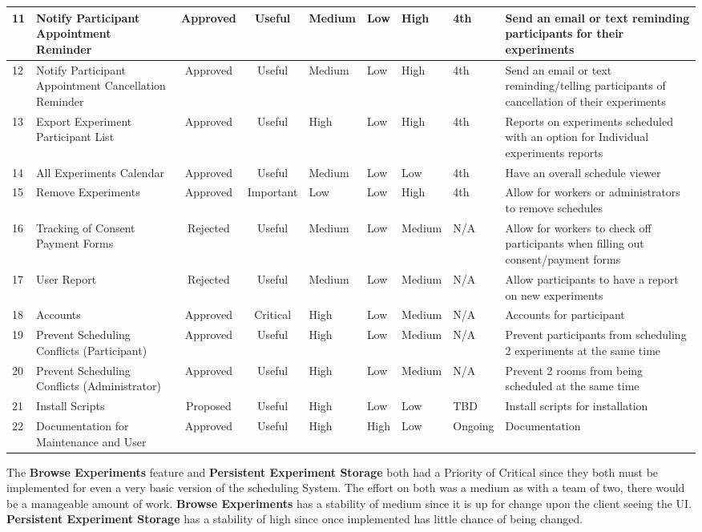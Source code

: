 \begin{table}[!h]
\begin{tabular}{|p{.5cm}|p{2.5cm}|c|c|p{1.25cm}|p{1cm}|p{1.25cm}|p{1cm}|p{3.75cm}|}
        \hline
        11 & Notify Participant Appointment Reminder & Approved & Useful & Medium & Low & High & 4th & Send an email or text reminding participants for their experiments \\
        \hline
         12 & Notify Participant Appointment Cancellation Reminder & Approved & Useful & Medium & Low & High & 4th & Send an email or text reminding/telling participants of cancellation of their experiments \\
        \hline
        13 & Export Experiment Participant List & Approved & Useful & High & Low & High & 4th & Reports on experiments scheduled with an option for Individual experiments reports \\
        \hline
        14 & All Experiments Calendar & Approved & Useful & Medium & Low & Low & 4th & Have an overall schedule viewer \\
        \hline
        15 & Remove Experiments & Approved & Important & Low & Low & High & 4th & Allow for workers or administrators to remove schedules \\
        \hline
        16 & Tracking of Consent Payment Forms & Rejected & Useful & Medium & Low & Medium & N/A & Allow for workers to check off participants when filling out consent/payment forms \\
        \hline
        17 & User Report & Rejected & Useful & Medium & Low & Medium & N/A & Allow participants to have a report on new experiments \\
        \hline
        18 & Accounts & Approved & Critical & High & Low & Medium & N/A & Accounts for participant \\
        \hline
        19 & Prevent Scheduling Conflicts (Participant) & Approved & Useful & High & Low & Medium & N/A & Prevent participants from scheduling 2 experiments at the same time \\
        \hline
        20 & Prevent Scheduling Conflicts (Administrator) & Approved & Useful & High & Low & Medium & N/A & Prevent 2 rooms from being scheduled at the same time \\
        \hline
        21 & Install Scripts & Proposed & Useful & High & Low & Low & TBD & Install scripts for installation \\
        \hline
        22 & Documentation for Maintenance and User & Approved & Useful & High & High & Low & Ongoing & Documentation \\
        \hline
    \end{tabular}
\end{table}
\clearpage
The \textbf{Browse Experiments} feature and \textbf{Persistent Experiment Storage} both had a Priority of Critical since they both must be implemented for even a very basic version of the scheduling System.  The effort on both was a medium as with a team of two, there would be a manageable amount of work.  \textbf{Browse Experiments} has a stability of medium since it is up for change upon the client seeing the UI.  \textbf{Persistent Experiment Storage} has a stability of high since once implemented has little chance of being changed.

